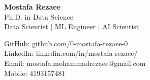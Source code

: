 \documentclass[11pt]{article}
\begin{document}

\begin{center}
	\begin{minipage}{0.45\textwidth}
		{\Huge\bfseries
			Mostafa Rezaee  %
		} \\ \medskip
		Ph.D. in Data Science \\ %
		Data Scientist $|$ ML Engineer $|$ AI Scientist 
	\end{minipage} \hfill
	\begin{minipage}{0.48\textwidth}
		GitHub: github.com/0-mostafa-rezaee-0 \\
		LinkedIn: linkedin.com/in/mostafa-rezaee/ \\
		Email: mostafa.mohammadrezaee@gmail.com \\
		Mobile: 4193157481
	\end{minipage}
\end{center}

\end{document}
